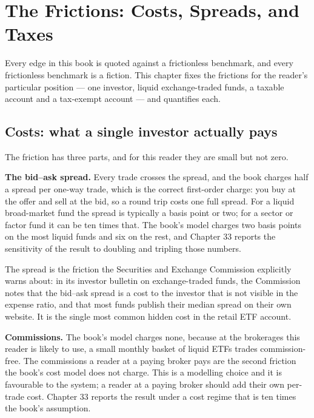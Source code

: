 
\chapter{The Frictions: Costs, Spreads, and Taxes}
\label{ch:frictions}

Every edge in this book is quoted against a frictionless benchmark, and
every frictionless benchmark is a fiction. This chapter fixes the
frictions for the reader's particular position --- one investor, liquid
exchange-traded funds, a taxable account and a tax-exempt account --- and
quantifies each.

\section{Costs: what a single investor actually pays}

The friction has three parts, and for this reader they are small but not
zero.

\textbf{The bid--ask spread.} Every trade crosses the spread, and the
book charges half a spread per one-way trade, which is the correct
first-order charge: you buy at the offer and sell at the bid, so a round
trip costs one full spread. For a liquid broad-market fund the spread is
typically a basis point or two; for a sector or factor fund it can be ten
times that. The book's model charges two basis points on the most liquid
funds and six on the rest, and Chapter 33 reports the sensitivity of the
result to doubling and tripling those numbers.

The spread is the friction the Securities and Exchange Commission
explicitly warns about: in its investor bulletin on exchange-traded funds,
the Commission notes that the bid--ask spread is a cost to the investor
that is not visible in the expense ratio, and that most funds publish
their median spread on their own website. It is the single most common
hidden cost in the retail ETF account.

\textbf{Commissions.} The book's model charges none, because at the
brokerages this reader is likely to use, a small monthly basket of
liquid ETFs trades commission-free. The commissions a reader at a paying
broker pays are the second friction the book's cost model does not
charge. This is a modelling choice and it is favourable to the system; a
reader at a paying broker should add their own per-trade cost. Chapter 33
reports the result under a cost regime
that is ten times the book's assumption.

